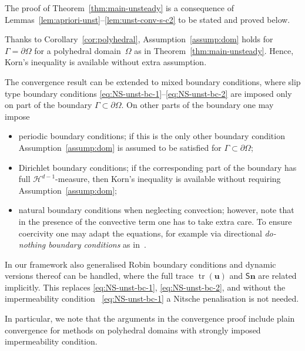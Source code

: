 \documentclass[reqno,a4paper]{amsart}
\def\tens#1{\pmb{\mathsf{#1}}}
\def\vec#1{\boldsymbol{#1}}
\def\tr{\mathop{\mathrm{tr}}\nolimits}
\def\bn{\vec{n}}
\def\bu{\vec{u}}
\def\BS{\tens{S}}
\begin{document}
{The proof of Theorem~\ref{thm:main-unsteady} is a consequence of Lemmas~\ref{lem:apriori-unst}--\ref{lem:unst-conv-s-c2} to be stated and proved below.}

\begin{remark}\label{rmk:mixed-bc}Thanks to Corollary~\ref{cor:polyhedral}, 
	Assumption~\ref{assump:dom} holds for~$\Gamma = \partial \Omega$ for a polyhedral domain~$\Omega$ as in Theorem~\ref{thm:main-unsteady}. 
	Hence, Korn's inequality is available without extra assumption. 
	
	The convergence result can be extended to mixed boundary conditions, where slip type boundary conditions \eqref{eq:NS-unst-bc-1}--\eqref{eq:NS-unst-bc-2} are imposed only on part of the boundary $\Gamma \subset \partial \Omega$. 
	On other parts of the boundary one may impose
	\begin{itemize} 
		\item periodic boundary conditions; if this is the only other boundary condition  Assumption~\ref{assump:dom} is assumed to be satisfied for $\Gamma \subset\partial \Omega$;
		\item Dirichlet boundary conditions; if the corresponding part of the boundary has full $\mathcal{H}^{d-1}$-measure, then Korn's inequality is available without requiring Assumption~\ref{assump:dom};
		\item natural boundary conditions when neglecting convection; however, note that in the presence of the convective term one has to take extra care. 
		To ensure coercivity one may adapt the equations, for example via directional \emph{do-nothing boundary conditions} as in~\cite{BraackMucha2014}. 
	\end{itemize}
	{In our framework also generalised Robin boundary conditions and dynamic versions thereof can be handled, where the full trace $\tr(\bu)$ and $\BS \bn$ are related implicitly.  
		This replaces \eqref{eq:NS-unst-bc-1}, \eqref{eq:NS-unst-bc-2}, and without the impermeability condition~ \eqref{eq:NS-unst-bc-1} a Nitsche penalisation is not needed.}
\end{remark}

{In particular, we note that the arguments in the convergence proof include plain convergence for methods on polyhedral domains with strongly imposed impermeability condition.}
\end{document}
